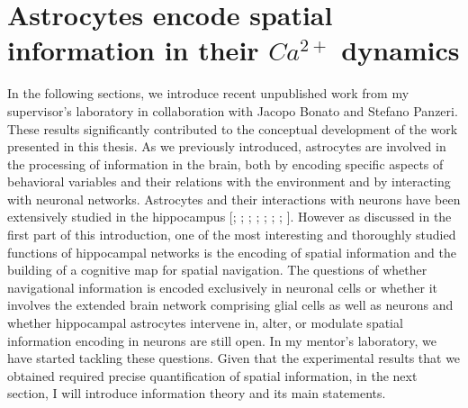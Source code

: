 \section{Astrocytes encode spatial information in their $Ca^{2+}$ dynamics}
\label{chap1:sec3:astro_spat_info}
In the following sections, we introduce recent unpublished work from my supervisor's laboratory in collaboration with Jacopo Bonato and Stefano Panzeri. These results significantly contributed to the conceptual development of the work presented in this thesis.
As we previously introduced, astrocytes are involved in the processing of information in the brain, both by encoding specific aspects of behavioral variables and their relations with the environment and by interacting with neuronal networks. 
Astrocytes and their interactions with neurons have been extensively studied in the hippocampus [\cite{perea2007}; \cite{pascual2005}; \cite{serrano2006gabaergic}; \cite{andersson2007}; \cite{chen2013heterosynaptic}; \cite{covelo2018}; \cite{fellin2004neuronal}; \cite{fellin2006purinergic}]. 
However as discussed in the first part of this introduction, one of the most interesting and thoroughly studied functions of hippocampal networks is the encoding of spatial information and the building of a cognitive map for spatial navigation.
The questions of whether navigational information is encoded exclusively in neuronal cells or whether it involves the extended brain network comprising glial cells as well as neurons and whether hippocampal astrocytes intervene in, alter, or modulate spatial information encoding in neurons are still open. 
In my mentor's laboratory, we have started tackling these questions. 
Given that the experimental results that we obtained required precise quantification of spatial information, in the next section, I will introduce information theory and its main statements.  

